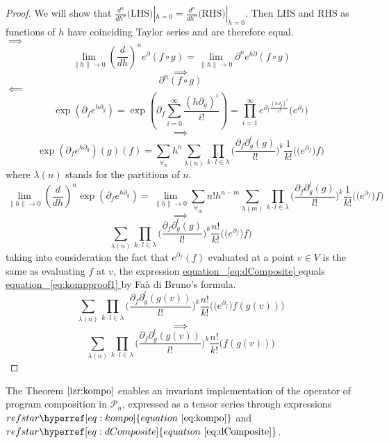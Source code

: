 \documentclass{article}
\makeatletter
\newcommand{\dP}{\mathcal{P}}
\newcommand{\D}{\partial}
\let\originaleqref\eqref %
\renewcommand{\eqref}[1]{%
  \begingroup%
  \let\ref\@refstar%
  \hyperref[#1]{%
    equation%
    ~\originaleqref{#1}%
  }%
  \endgroup
}
\makeatother
\begin{document}
\begin{proof}
  We will show that $\frac{d^n}{dh^n}\text{(LHS)}|_{h=0}=\frac{d^n}{dh^n}\text{(RHS)}|_{h=0}$. Then $\text{LHS}$ and $\text{RHS}$ as functions
  of $h$ have coinciding Taylor series and are therefore equal.\\
 $\implies$
 $$\lim\limits_{\lVert h\rVert\to 0}(\frac{d}{dh})^ne^\D(f\circ g)=\lim\limits_{\lVert h\rVert\to 0}\D^ne^{h\D}(f\circ g)$$
 $$\implies$$
 \begin{equation}\label{eq:kompproof1}
 \D^n(f\circ g)
 \end{equation}
 $\impliedby$
 $$\exp(\D_fe^{h\D_g})=\exp\left(\D_f\sum\limits_{i=0}^{\infty}\frac{(h\D_g)^i}{i!}\right)=\prod_{i=1}^{\infty}e^{\D_f\frac{(h\D_g)^i}{i!}}\Big(e^{\D_f}\Big)$$
 $$\implies$$
 $$\exp(\D_fe^{h\D_g})(g)(f)=\sum\limits_{\forall_n}h^n\sum\limits_{\lambda(n)}\prod\limits_{k\cdot l\in\lambda}\Big(\frac{\D_f\D_g^l(g)}{l!}\Big)^k\frac{1}{k!}\Big(\Big(e^{\D_f}\Big)f\Big)$$
 where $\lambda(n)$ stands for the partitions of $n$.
 $$\lim\limits_{\lVert h\rVert\to 0}(\frac{d}{dh})^n\exp(\D_fe^{h\D_g})=\lim\limits_{\lVert h\rVert\to 0}\sum\limits_{\forall_m}n!h^{n-m}\sum\limits_{\lambda(m)}\prod\limits_{k\cdot l\in\lambda}\Big(\frac{\D_f\D_g^l(g)}{l!}\Big)^k\frac{1}{k!}\Big(\Big(e^{\D_f}\Big)f\Big)$$
 $$\implies$$
 \begin{equation}\label{eq:dComposite}
 \sum\limits_{\lambda(n)}\prod\limits_{k\cdot l\in\lambda}\Big(\frac{\D_f\D_g^l(g)}{l!}\Big)^k\frac{n!}{k!}\Big(\Big(e^{\D_f}\Big)f\Big)
 \end{equation}
 taking into consideration the fact that $e^{\D_f}(f)$ evaluated at a point $v\in V$ is the same as evaluating $f$ at $v$, the expression \eqref{eq:dComposite} equals \eqref{eq:kompproof1} by Faà di Bruno's formula.
   $$\sum\limits_{\lambda(n)}\prod\limits_{k\cdot l\in\lambda}\Big(\frac{\D_f\D_g^l(g(v))}{l!}\Big)^k\frac{n!}{k!}\Big(\Big(e^{\D_f}\Big)f(g(v))\Big)$$
   $$\implies$$
   \begin{equation}\label{eq:dCompositePoint}
   \sum\limits_{\lambda(n)}\prod\limits_{k\cdot l\in\lambda}\Big(\frac{\D_f\D_g^l(g(v))}{l!}\Big)^k\frac{n!}{k!}\Big(f(g(v))\Big)
   \end{equation}
 \end{proof}       
 The Theorem $\ref{izr:kompo}$ enables an invariant implementation of the operator of program composition in $\dP_n$, expressed as a tensor series through expressions $\eqref{eq:kompo}$ and $\eqref{eq:dComposite}$. 
 
\end{document}
